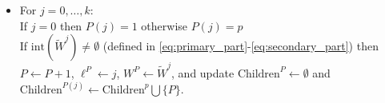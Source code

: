 \documentclass[12pt,x11names]{article}
\theoremstyle{definition}
\newcommand{\paren}[1]{\left\{ {#1} \right\}} %
\newcommand{\inter}{\mathrm{int}} %
\newcommand{\bw}{{\bf w}}
\newcommand{\bbb}{{\bf B}}
\begin{document}
\begin{algorithm}[h]
\begin{itemize}
\begin{itemize}
\begin{itemize}
\begin{itemize}
              \item For $j=0,\ldots,k$:\\ 
              If $j=0$ then $P(j)=1$ otherwise $P(j)=p$\\
              If  $\inter(\tilde{W}^j)\neq \emptyset$ (defined in \eqref{eq:primary_part}-\eqref{eq:secondary_part}) then $P\leftarrow P+1$, $\ell^P\leftarrow j$, $W^{P}\leftarrow\tilde{W}^j$, %
               and update $\text{Children}^P\leftarrow\emptyset$ and $\text{Children}^{P(j)}\leftarrow\text{Children}^p\bigcup\{P\}$. 
              \end{itemize}        
            \end{itemize}
             \end{itemize}
        \end{itemize} 
\end{algorithm}
\end{document}
